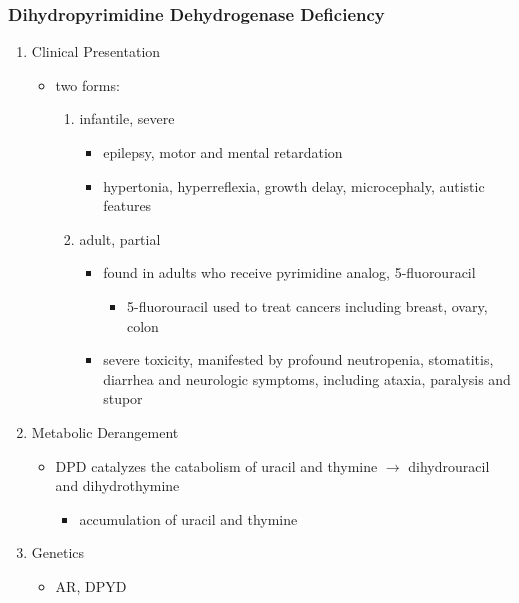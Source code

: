\documentclass{scrartcl}
\begin{document}
\subsubsection{Dihydropyrimidine Dehydrogenase Deficiency}
\label{sec:orgc6104d8}
\begin{enumerate}
\item Clinical Presentation
\label{sec:org7d9149e}
\begin{itemize}
\item two forms:
\begin{enumerate}
\item infantile, severe
\begin{itemize}
\item epilepsy, motor and mental retardation
\item hypertonia, hyperreflexia, growth delay, microcephaly, autistic features
\end{itemize}
\item adult, partial
\begin{itemize}
\item found in adults who receive pyrimidine analog, 5-fluorouracil
\begin{itemize}
\item 5-fluorouracil used to treat cancers including breast, ovary, colon
\end{itemize}
\item severe toxicity, manifested by profound neutropenia, stomatitis,
diarrhea and neurologic symptoms, including ataxia, paralysis
and stupor
\end{itemize}
\end{enumerate}
\end{itemize}

\item Metabolic Derangement
\label{sec:org47978e9}
\begin{itemize}
\item DPD catalyzes the catabolism of uracil and thymine \(\to\) dihydrouracil
and dihydrothymine
\begin{itemize}
\item accumulation of uracil and thymine
\end{itemize}
\end{itemize}

\item Genetics
\label{sec:org7299835}
\begin{itemize}
\item AR, DPYD
\end{itemize}


\end{enumerate}
\end{document}
